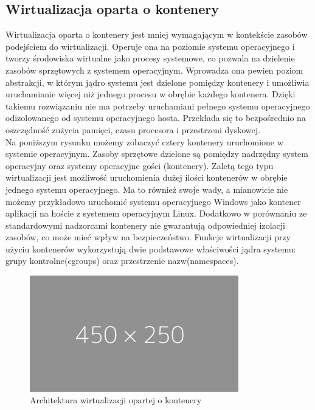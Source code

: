 \documentclass[12pt]{report}
\let\Oldsubsection\subsection
\renewcommand{\subsection}{\FloatBarrier\Oldsubsection}
\begin{document}
\subsection{Wirtualizacja oparta o kontenery}
Wirtualizacja oparta o kontenery jest mniej wymagającym w kontekście zasobów podejściem do wirtualizacji. Operuje ona na poziomie systemu operacyjnego i tworzy środowiska wirtualne jako procesy systemowe, co pozwala na dzielenie zasobów sprzętowych z systemem operacyjnym. Wprowadza ona pewien poziom abstrakcji, w którym jądro systemu jest dzielone pomiędzy kontenery i umożliwia uruchamianie więcej niż jednego procesu w obrębie każdego kontenera. Dzięki takiemu rozwiązaniu nie ma potrzeby uruchamiani pełnego systemu operacyjnego odizolowanego od systemu operacyjnego hosta. Przekłada się to bezpośrednio na oszczędność zużycia pamięci, czasu procesora i przestrzeni dyskowej. \\
\indent Na poniższym rysunku możemy zobaczyć cztery kontenery uruchomione w systemie operacyjnym. Zasoby sprzętowe dzielone są pomiędzy nadrzędny system operacyjny oraz systemy operacyjne gości (kontenery). Zaletą tego typu wirtualizacji jest możliwość uruchomienia dużej ilości kontenerów w obrębie jednego systemu operacyjnego. Ma to również swoje wady, a mianowicie nie możemy przykładowo uruchomić systemu operacyjnego Windows jako kontener aplikacji na hoście z systemem operacyjnym Linux. Dodatkowo w porównaniu ze standardowymi nadzorcami kontenery nie gwarantują odpowiedniej izolacji zasobów, co może mieć wpływ na bezpieczeństwo. Funkcje wirtualizacji przy użyciu kontenerów wykorzystują dwie podstawowe właściwości jądra systemu: grupy kontrolne(cgroups) oraz przestrzenie nazw(namespaces).

\begin{figure}[h]
	\centering
	\includegraphics[width=0.81\textwidth]{images/placeholder-wide.png}
	\caption{Architektura wirtualizacji opartej o kontenery}
\end{figure}
\end{document}
